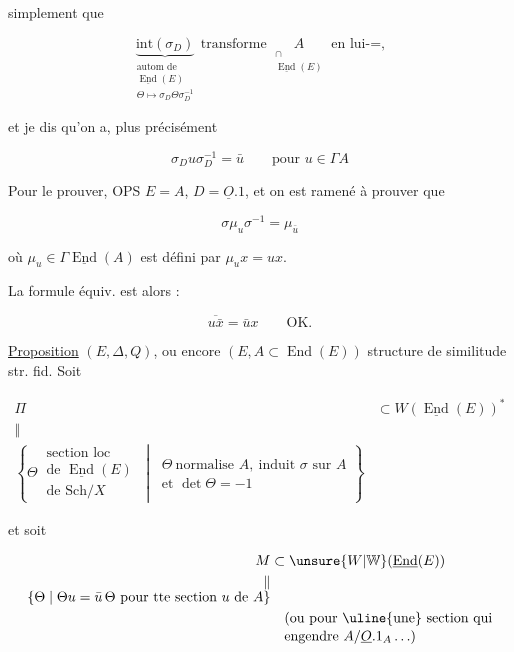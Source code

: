 
simplement que

\[
\underbrace{\mathrm{int}(\sigma_D)}_{\substack{\text{autom de}\\\underline{\operatorname{End}}(E)\\\Theta\longmapsto\sigma_D\Theta\sigma_D^{-1}}}\ \text{transforme }\underset{\substack{\cap\\\underline{\operatorname{End}}(E)}}{A}\text{ en }\text{lui-}\mathord{=},
\]

et je dis qu'on a, plus précisément

\[
\boxed{\sigma_D u\sigma_D^{-1}=\bar u}\qquad\text{pour }u\in\Gamma A
\]

Pour le prouver, OPS $E=A$,  $D=\underline O.1$, et on est ramené à prouver que

\[
\sigma\mu_u\sigma^{-1}=\mu_{\bar u}
\]

où $\mu_u\in\Gamma\underline{\operatorname{End}}(A)$ est défini par $\mu_u x=ux$.

La formule équiv. est alors :

\[
\overline{u\bar x}=\bar u x\qquad\text{OK.}
\]

\uline{Proposition} $(E,\Delta,Q)$, ou encore $(E,A\subset\operatorname{End}(E))$ structure de similitude str. fid. Soit

\[
\begin{aligned}
\Pi&\subset W(\underline{\operatorname{End}}(E))^*\\
\Vert&\\[-4pt]
\left\{\Theta\ \substack{\text{section loc}\\\text{de }\underline{\operatorname{End}}(E)\\\text{de }\mathrm{Sch}/X}\ \middle|\ \substack{\Theta\ \text{normalise }A,\ \text{induit }\sigma\text{ sur }A\\\text{et }\det\Theta=-1}\right\}&
\end{aligned}
\]

 \deleted{$\unsure{\Theta}$} et soit

\[
\begin{aligned}
M&\subset\unsure{W|\mathbb W}(\underline{\operatorname{End}}(E))\\
\Vert&\\[-4pt]
\{\Theta\mid\Theta u=\bar u\,\Theta\ \text{pour tte section }u\ \text{de }A\}&\\
&\quad\text{(ou pour \uline{une} section qui}\\[-2pt]
&\quad\text{engendre }A/\underline O.1_A\ldots)
\end{aligned}
\]

